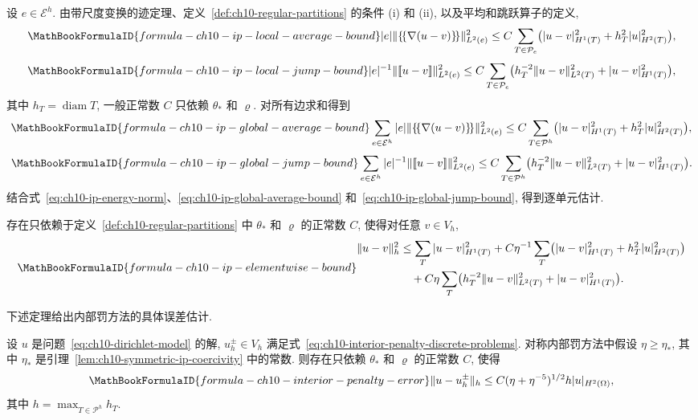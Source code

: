 设 $e\in\mathcal E^h$. 由带尺度变换的迹定理、定义~\ref{def:ch10-regular-partitions} 的条件 (i) 和 (ii), 以及平均和跳跃算子的定义,
\[
\MathBookFormulaID{formula-ch10-ip-local-average-bound}
|e|\|\{\!\{\nabla(u-v)\}\!\}\|_{L^2(e)}^2
\leq C\sum_{T\in\mathcal P_e}\bigl(|u-v|_{H^1(T)}^2+h_T^2|u|_{H^2(T)}^2\bigr),
\]
\[
\MathBookFormulaID{formula-ch10-ip-local-jump-bound}
|e|^{-1}\|[\![u-v]\!]\|_{L^2(e)}^2
\leq C\sum_{T\in\mathcal P_e}\bigl(h_T^{-2}\|u-v\|_{L^2(T)}^2+|u-v|_{H^1(T)}^2\bigr),
\]
其中 $h_T=\operatorname{diam}T$, 一般正常数 $C$ 只依赖 $\theta_*$ 和 $\varrho$. 对所有边求和得到
\begin{equation}
\MathBookFormulaID{formula-ch10-ip-global-average-bound}
\label{eq:ch10-ip-global-average-bound}
\sum_{e\in\mathcal E^h}|e|\|\{\!\{\nabla(u-v)\}\!\}\|_{L^2(e)}^2
\leq C\sum_{T\in\mathcal P^h}\bigl(|u-v|_{H^1(T)}^2+h_T^2|u|_{H^2(T)}^2\bigr),
\end{equation}
\begin{equation}
\MathBookFormulaID{formula-ch10-ip-global-jump-bound}
\label{eq:ch10-ip-global-jump-bound}
\sum_{e\in\mathcal E^h}|e|^{-1}\|[\![u-v]\!]\|_{L^2(e)}^2
\leq C\sum_{T\in\mathcal P^h}\bigl(h_T^{-2}\|u-v\|_{L^2(T)}^2+|u-v|_{H^1(T)}^2\bigr).
\end{equation}
结合式~\eqref{eq:ch10-ip-energy-norm}、\eqref{eq:ch10-ip-global-average-bound} 和~\eqref{eq:ch10-ip-global-jump-bound}, 得到逐单元估计.

\begin{Lemma}
\label{lem:ch10-ip-elementwise-bound}
存在只依赖于定义~\ref{def:ch10-regular-partitions} 中 $\theta_*$ 和 $\varrho$ 的正常数 $C$, 使得对任意 $v\in V_h$,
\[
\MathBookFormulaID{formula-ch10-ip-elementwise-bound}
\begin{split}
\|u-v\|_h^2
&\leq\sum_T|u-v|_{H^1(T)}^2
+C\eta^{-1}\sum_T\bigl(|u-v|_{H^1(T)}^2+h_T^2|u|_{H^2(T)}^2\bigr)\\
&\quad+C\eta\sum_T\bigl(h_T^{-2}\|u-v\|_{L^2(T)}^2+|u-v|_{H^1(T)}^2\bigr).
\end{split}
\]
\end{Lemma}

下述定理给出内部罚方法的具体误差估计.

\begin{Theorem}
\label{thm:ch10-interior-penalty-error}
设 $u$ 是问题~\eqref{eq:ch10-dirichlet-model} 的解, $u_h^\pm\in V_h$ 满足式~\eqref{eq:ch10-interior-penalty-discrete-problems}. 对称内部罚方法中假设 $\eta\geq\eta_*$, 其中 $\eta_*$ 是引理~\ref{lem:ch10-symmetric-ip-coercivity} 中的常数. 则存在只依赖 $\theta_*$ 和 $\varrho$ 的正常数 $C$, 使得
\begin{equation}
\MathBookFormulaID{formula-ch10-interior-penalty-error}
\label{eq:ch10-interior-penalty-error}
\|u-u_h^\pm\|_h\leq C(\eta+\eta^{-5})^{1/2}h|u|_{H^2(\Omega)},
\end{equation}
其中 $h=\max_{T\in\mathcal P^h}h_T$.
\end{Theorem}

